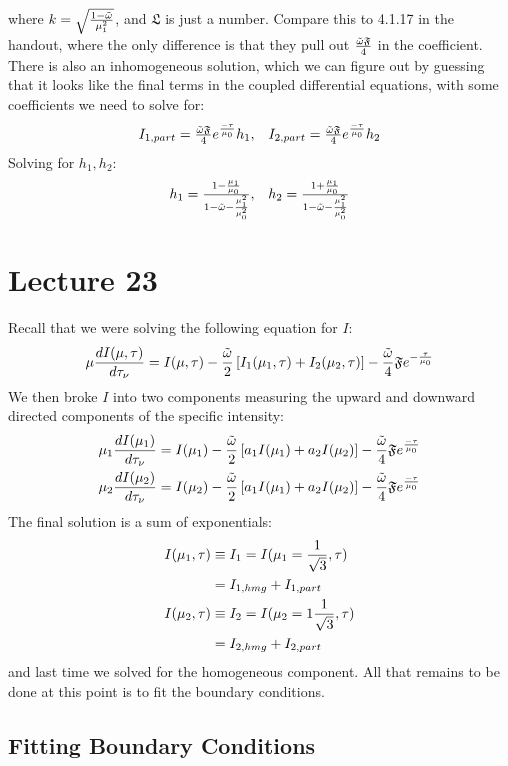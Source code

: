 \documentclass[11pt]{article}
\def\inv#1{{1 \over #1}}
\begin{document}
where $k=\sqrt{1-{\tilde\omega}\over\mu_1^2}$, and $\mathfrak{L}$ is just a number.  Compare this
to 4.1.17 in the handout, where the only difference is that they pull out 
${\tilde\omega}\mathfrak{F}\over4$ in
the coefficient.  There is also an inhomogeneous solution, which we can figure
out by guessing that it looks like the final terms in the coupled differential
equations, with some coefficients we need to solve for:
$$\begin{matrix} I_{1,part}={{\tilde\omega}\mathfrak{F}\over4}e^{-\tau\over\mu_0}h_1,&
I_{2,part}={{\tilde\omega}\mathfrak{F}\over4}e^{-\tau\over\mu_0}h_2\end{matrix}$$
Solving for $h_1, h_2$:
$$\begin{matrix} h_1={1-{\mu_1\over\mu_0}\over1-{\tilde\omega}-{\mu_1^2\over\mu_0^2}},&
h_2={1+{\mu_1\over\mu_0}\over1-{\tilde\omega}-{\mu_1^2\over\mu_0^2}}\end{matrix}$$

\section*{ Lecture 23 }

Recall that we were solving the following equation for $I$:
$$\mu{dI(\mu,\tau)\over d\tau_\nu}=I(\mu,\tau)-{{\tilde\omega}\over2}\left[I_1(\mu_1,\tau)+
I_2(\mu_2,\tau)\right]-{{\tilde\omega}\over4}\mathfrak{F}e^{-{\tau\over\mu_0}}$$
We then broke $I$ into two components measuring the upward and downward directed
components of the specific intensity:
$$\begin{aligned}\mu_1{dI(\mu_1)\over d\tau_\nu}&=I(\mu_1)-{{\tilde\omega}\over2}\left[a_1I(\mu_1)+a_2I(\mu_2)\right]-{{\tilde\omega}\over4}\mathfrak{F}
e^{-\tau\over\mu_0}\\ 
\mu_2{dI(\mu_2)\over d\tau_\nu}&=I(\mu_2)-{{\tilde\omega}\over2}\left[a_1I(\mu_1)+a_2I(\mu_2)\right]-{{\tilde\omega}\over4}\mathfrak{F}
e^{-\tau\over\mu_0}\\ \end{aligned}$$
The final solution is a sum of exponentials:
$$\begin{aligned}I(\mu_1,\tau)&\equiv I_1=I(\mu_1=\inv{\sqrt{3}},\tau)\\ 
&=I_{1,hmg}+I_{1,part}\\ 
I(\mu_2,\tau)&\equiv I_2=I(\mu_2=1\inv{\sqrt{3}},\tau)\\ 
&=I_{2,hmg}+I_{2,part}\\ \end{aligned}$$
and last time we solved for the homogeneous component.  All that remains to
be done at this point is to fit the boundary conditions.

\subsection*{ Fitting Boundary Conditions }
\end{document}
